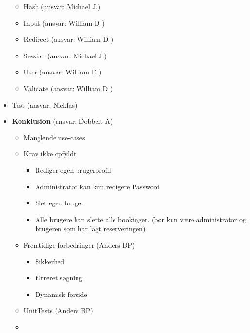 \documentclass[12pt,a4paper]{report} %
\begin{document}
\begin{itemize}
\begin{itemize}
                \item Hash (ansvar: Michael J.)
                \item Input (ansvar: William D ) 
                \item Redirect (ansvar: William D ) 
                \item Session (ansvar: Michael J.)
                \item User (ansvar: William D ) 
                \item Validate (ansvar: William D ) 
             \end{itemize} 
         \item Test (ansvar: Nicklas)
        \item \textbf{Konklusion}  (ansvar: Dobbelt A) 
            \begin{itemize}
                    \item Manglende use-cases
                    \item Krav ikke opfyldt
                    \begin{itemize}
                        \item 
                        Rediger egen brugerprofil
                        \item
                        Administrator kan kun redigere Password
                        \item
                        Slet egen bruger
                        \item
                        Alle brugere kan slette alle bookinger. (bør kun være administrator og brugeren som har lagt reserveringen)
                        
                 \end{itemize}
                    \item Fremtidige forbedringer (Anders BP)
                    \begin{itemize}
                        \item Sikkerhed
                        \item filtreret søgning
                        \item Dynamisk forside
                    \end{itemize}
                    
                    \item UnitTests (Anders BP)
                    \item 
                 \end{itemize}
            
        
         
    \end{itemize}
    
    
    
\end{document}

